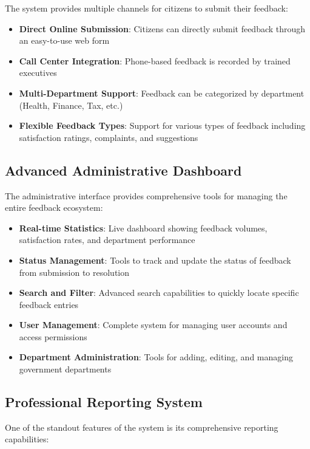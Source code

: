 \documentclass[12pt,a4paper]{article}
\begin{document}
The system provides multiple channels for citizens to submit their feedback:

\begin{itemize}[leftmargin=2em]
    \item \textbf{Direct Online Submission}: Citizens can directly submit feedback through an easy-to-use web form
    \item \textbf{Call Center Integration}: Phone-based feedback is recorded by trained executives
    \item \textbf{Multi-Department Support}: Feedback can be categorized by department (Health, Finance, Tax, etc.)
    \item \textbf{Flexible Feedback Types}: Support for various types of feedback including satisfaction ratings, complaints, and suggestions
\end{itemize}

\subsection{Advanced Administrative Dashboard}

The administrative interface provides comprehensive tools for managing the entire feedback ecosystem:

\begin{itemize}[leftmargin=2em]
    \item \textbf{Real-time Statistics}: Live dashboard showing feedback volumes, satisfaction rates, and department performance
    \item \textbf{Status Management}: Tools to track and update the status of feedback from submission to resolution
    \item \textbf{Search and Filter}: Advanced search capabilities to quickly locate specific feedback entries
    \item \textbf{User Management}: Complete system for managing user accounts and access permissions
    \item \textbf{Department Administration}: Tools for adding, editing, and managing government departments
\end{itemize}

\subsection{Professional Reporting System}

One of the standout features of the system is its comprehensive reporting capabilities:
\end{document}
